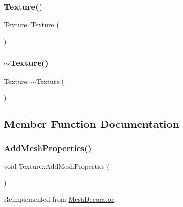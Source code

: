 \subsubsection{\texorpdfstring{Texture()}{Texture()}\hspace{0.1cm}{\footnotesize\ttfamily [2/2]}}
{\footnotesize\ttfamily Texture\+::\+Texture (\begin{DoxyParamCaption}{ }\end{DoxyParamCaption})\hspace{0.3cm}{\ttfamily [inline]}}

\mbox{\label{class_texture_a09c4bcb7462f64c1d20fa69dba3cee8a}} 
\subsubsection{\texorpdfstring{$\sim$Texture()}{~Texture()}\hspace{0.1cm}{\footnotesize\ttfamily [2/2]}}
{\footnotesize\ttfamily Texture\+::$\sim$\+Texture (\begin{DoxyParamCaption}{ }\end{DoxyParamCaption})\hspace{0.3cm}{\ttfamily [inline]}}



\subsection{Member Function Documentation}
\mbox{\label{class_texture_aa7e2f179b2117c32e03e38fdc0f85290}} 
\subsubsection{\texorpdfstring{AddMeshProperties()}{AddMeshProperties()}}
{\footnotesize\ttfamily void Texture\+::\+Add\+Mesh\+Properties (\begin{DoxyParamCaption}{ }\end{DoxyParamCaption})\hspace{0.3cm}{\ttfamily [virtual]}}



Reimplemented from \mbox{\hyperlink{class_mesh_decorator_a8afe0a2ff59d5c10e8b48b2307c05e53}{Mesh\+Decorator}}.

